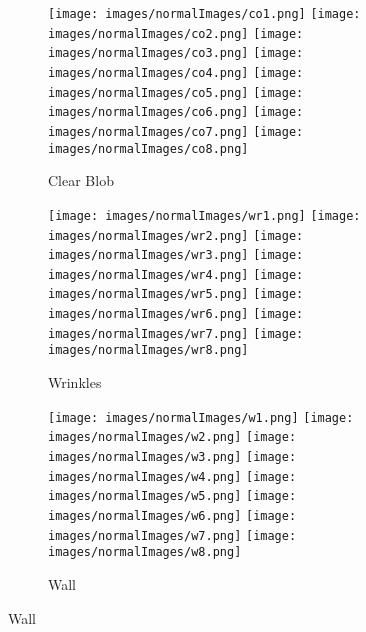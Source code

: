 \documentclass[review,12pt,3p]{elsarticle}
\begin{document}
\begin{figure}
        \begin{subfigure}[b]{0.5\textwidth}
                \texttt{[image: images/normalImages/co1.png]}
                \texttt{[image: images/normalImages/co2.png]}
                \texttt{[image: images/normalImages/co3.png]}
                \texttt{[image: images/normalImages/co4.png]}
                \texttt{[image: images/normalImages/co5.png]}
                \texttt{[image: images/normalImages/co6.png]}
                \texttt{[image: images/normalImages/co7.png]}
                \texttt{[image: images/normalImages/co8.png]}
                \caption{Clear Blob}\label{fig:dataset_3}
        \end{subfigure}%

        \begin{subfigure}[b]{0.5\textwidth}
                \texttt{[image: images/normalImages/wr1.png]}
                \texttt{[image: images/normalImages/wr2.png]}
                \texttt{[image: images/normalImages/wr3.png]}
                \texttt{[image: images/normalImages/wr4.png]}
                \texttt{[image: images/normalImages/wr5.png]}
                \texttt{[image: images/normalImages/wr6.png]}
                \texttt{[image: images/normalImages/wr7.png]}
                \texttt{[image: images/normalImages/wr8.png]}
                \caption{Wrinkles}\label{fig:dataset_4}
        \end{subfigure}%

        \begin{subfigure}[b]{0.5\textwidth}
                \texttt{[image: images/normalImages/w1.png]}
                \texttt{[image: images/normalImages/w2.png]}
                \texttt{[image: images/normalImages/w3.png]}
                \texttt{[image: images/normalImages/w4.png]}
                \texttt{[image: images/normalImages/w5.png]}
                \texttt{[image: images/normalImages/w6.png]}
                \texttt{[image: images/normalImages/w7.png]}
                \texttt{[image: images/normalImages/w8.png]}
                \caption{Wall}\label{fig:dataset_5}
        \end{subfigure}%



\end{figure}
\end{document}
